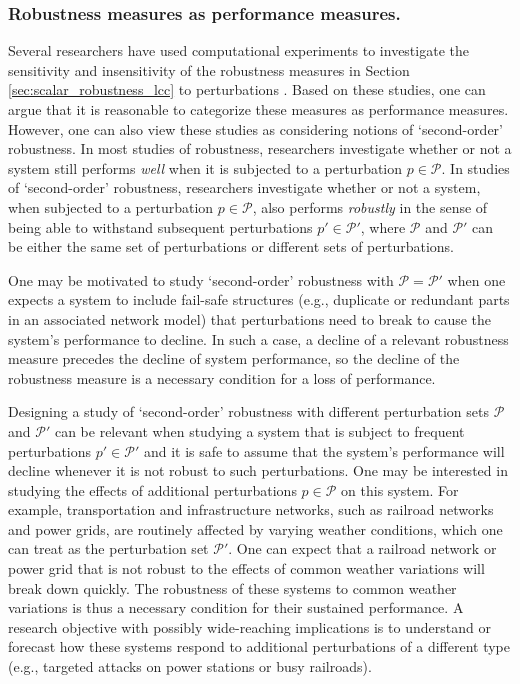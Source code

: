 \documentclass{comnet-mod}
\begin{document}
\subsubsection{Robustness measures as performance measures.}\label{sec:robustness_ambiguity}


Several researchers have used computational experiments to investigate the sensitivity and insensitivity of the robustness measures in Section \ref{sec:scalar_robustness_lcc} to perturbations \cite{Eubank2004, Wu2010a, Zhang2013b, Wang2014b, Cozzo2018, Yamashita2019}. Based on these studies, one can argue that 
it is reasonable to categorize these measures as performance measures. However, one can also view these studies as considering notions of `second-order' robustness. In most studies of robustness, researchers investigate whether or not a system still performs \textit{well} when it is subjected to a perturbation $p\in\mathcal P$. In studies of `second-order' robustness, researchers investigate whether or not a system, when subjected to a perturbation $p \in \mathcal P$, also performs \textit{robustly} in the sense of being able to withstand subsequent perturbations $p' \in \mathcal P'$, where $\mathcal P$ and $\mathcal P'$ can be either the same set of perturbations or different sets of perturbations.  

One may be motivated to study `second-order' robustness with $\mathcal P = \mathcal P'$ when one expects a system to include fail-safe structures (e.g., duplicate or redundant parts in an associated network model) that perturbations need to break to cause the system's performance to decline. In such a case, a decline of a relevant robustness measure precedes the decline of system performance, so the decline of the robustness measure is
a necessary condition for a loss of performance.

Designing a study of `second-order' robustness with different perturbation sets $\mathcal P$ and $\mathcal P'$ can be relevant when studying a system that is subject to frequent perturbations $p' \in \mathcal P'$ and it is safe to assume that the system's performance will decline whenever it is not robust to such perturbations. One may be interested in studying the effects of additional perturbations $p \in \mathcal P$ on this system. For example, transportation and infrastructure networks, such as railroad networks and power grids, are routinely affected by varying weather conditions, which one can treat as the perturbation set $\mathcal P'$. One can expect that a railroad network or power grid that is not robust to the effects of common weather variations will break down quickly. The robustness of these systems to common weather variations is thus a necessary condition for their sustained performance. A research objective with possibly wide-reaching implications is to understand or forecast how these systems respond to additional perturbations of a different type (e.g., targeted attacks on power stations or busy railroads).
\end{document}
